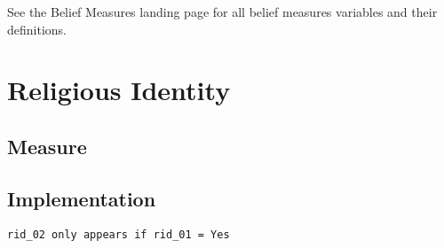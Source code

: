 \documentclass[
  letterpaper,
]{scrbook}
\begin{document}
See the Belief Measures landing page for all belief measures variables
and their definitions.

\chapter{Religious Identity}\label{religious-identity}

\section{Measure}\label{measure-19}

\section{Implementation}\label{implementation-19}

\texttt{rid\_02\ only\ appears\ if\ rid\_01\ =\ Yes}
\end{document}
